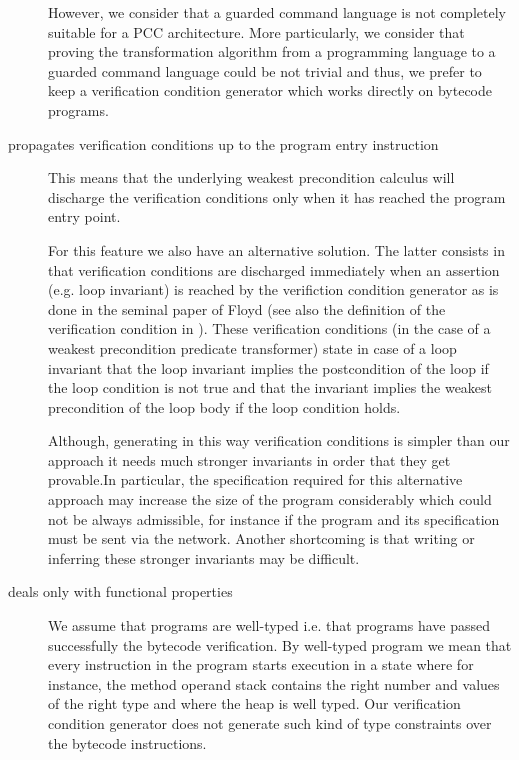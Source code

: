 \begin{description}
	However, we consider that a guarded command language 
	is not completely suitable for a PCC architecture.
	More particularly, we consider that proving the transformation algorithm from a programming language to a 
	guarded command language could be not trivial and thus, we prefer to keep a verification condition generator 
	which works directly on bytecode programs. 


  
   \item [propagates verification conditions up to the program entry instruction]
         This means that the underlying weakest precondition calculus will discharge the verification 
	 conditions only when it has reached the program entry point. 

         For this feature we also have an alternative solution. The latter consists in
	 that verification conditions are discharged immediately when an assertion (e.g. loop invariant)
	 is reached by the verifiction condition generator as is done in the seminal paper of Floyd \cite{F67amp}
	 (see also the definition of the verification condition in \cite{gta05:fast}).
	 These verification conditions (in the case of a weakest precondition predicate transformer) state in case of a loop invariant
	 that the loop invariant implies the postcondition of the loop if the loop condition is not true and that the invariant implies the weakest precondition 
	 of the loop body if the loop condition holds.

	 Although, generating in this way verification conditions is simpler 
	 than our approach it needs much stronger invariants in order that they get provable.In particular, the specification 
	 required for this alternative approach may increase the size of the program considerably which could not be always admissible,
	 for instance if the program and its specification must be sent via the network.
	 Another shortcoming is that writing or inferring these stronger invariants
	 may be difficult. 
	 

  \item [deals only with functional properties] 
        We assume that programs are well-typed i.e. that programs
	have passed successfully the bytecode verification. By well-typed program we mean that  every
	instruction in the program starts execution in a  state where for instance, the method operand
	stack contains the right number and values of the right type
	and where the heap is well typed. Our 
	verification condition generator does not generate such kind of type constraints over 
	the bytecode instructions.
	

\end{description}
